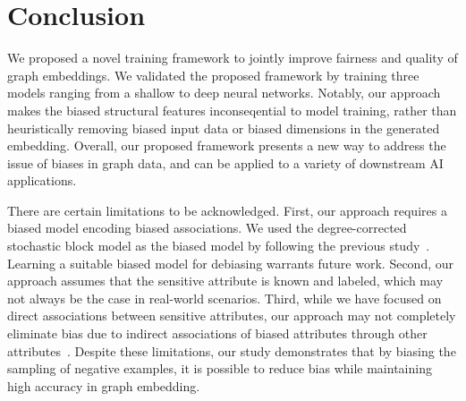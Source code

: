 \documentclass{article}
\theoremstyle{plain}
\theoremstyle{definition}
\theoremstyle{remark}
\begin{document}
\section{Conclusion}

We proposed a novel training framework to jointly improve fairness and quality of graph embeddings. 
We validated the proposed framework by training three models ranging from a shallow to deep neural networks.
Notably, our approach makes the biased structural features inconseqential to model training, rather than 
heuristically removing biased input data or biased dimensions in the generated embedding.
Overall, our proposed framework presents a new way to address the issue of biases in graph data, and can be applied to a variety of downstream AI applications.

There are certain limitations to be acknowledged.
First, our approach requires a biased model encoding biased associations.
We used the degree-corrected stochastic block model as the biased model by following the previous study~\cite{kojakuResidual2VecDebiasingGraph2021}.
Learning a suitable biased model for debiasing warrants future work.
Second, our approach assumes that the sensitive attribute is known and labeled, which may not always be the case in real-world scenarios. 
Third, while we have focused on direct associations between sensitive attributes, our approach may not completely eliminate bias due to indirect associations of biased attributes through other attributes~\cite{DBLP:journals/corr/abs-1903-03862}. Despite these limitations, our study demonstrates that by biasing the sampling of negative examples, it is possible to reduce bias while maintaining high accuracy in graph embedding.





\end{document}
